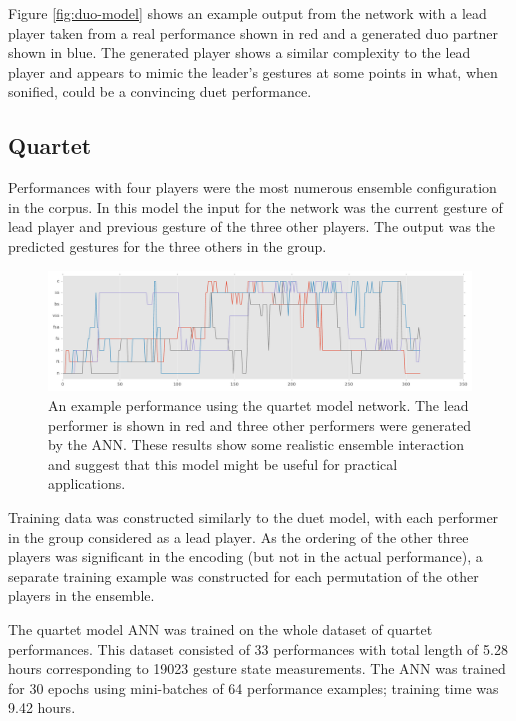 \documentclass{article}
\begin{document}
Figure \ref{fig:duo-model} shows an example output from the network
with a lead player taken from a real performance shown in red and a
generated duo partner shown in blue. The generated player shows a
similar complexity to the lead player and appears to mimic the
leader's gestures at some points in what, when sonified, could be a
convincing duet performance.



\subsection{Quartet}

Performances with four players were the most numerous ensemble
configuration in the corpus. In this model the input for the network
was the current gesture of lead player and previous gesture of the
three other players. The output was the predicted gestures for the
three others in the group.

\begin{figure}
  \centering
  \includegraphics[width=\textwidth]{quartet-performance-512nodes-16}
  \caption{An example performance using the quartet model network. The
    lead performer is shown in red and three other performers were
    generated by the ANN. These results show some realistic ensemble
    interaction and suggest that this model might be useful for
    practical applications.}\label{fig:quartet-model}
\end{figure}

Training data was constructed similarly to the duet model, with each
performer in the group considered as a lead player. As the ordering of
the other three players was significant in the encoding (but not in
the actual performance), a separate training example was constructed
for each permutation of the other players in the ensemble.

The quartet model ANN was trained on the whole dataset of quartet
performances. This dataset consisted of 33 performances with total
length of 5.28 hours corresponding to 19023 gesture state
measurements. The ANN was trained for 30 epochs using mini-batches of
64 performance examples; training time was 9.42 hours.
\end{document}
